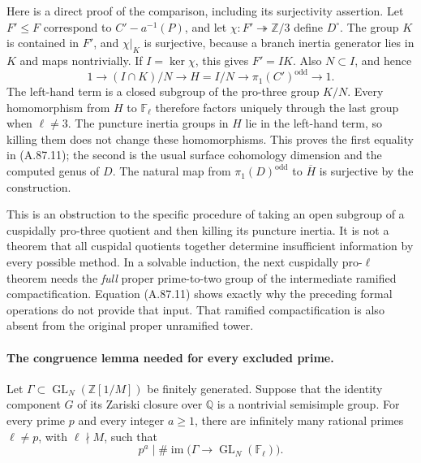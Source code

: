 \documentclass[11pt]{article}
\begin{document}
Here is a direct proof of the comparison, including its
surjectivity assertion. Let \(F'\leq F\) correspond to
\(C'-a^{-1}(P)\), and let
\(\chi:F'\twoheadrightarrow\mathbb Z/3\) define
\(D^\circ\). The group \(K\) is contained in \(F'\),
and \(\chi|_K\) is surjective, because a branch inertia
generator lies in \(K\) and maps nontrivially. If
\(I=\ker\chi\), this gives \(F'=IK\). Also \(N\subset I\),
and hence
\[
 1\longrightarrow (I\cap K)/N\longrightarrow
 H=I/N\longrightarrow \pi_1(C')^{\mathrm{odd}}
 \longrightarrow1.                                  \tag{A.87.12}
\]
The left-hand term is a closed subgroup of the pro-three
group \(K/N\). Every homomorphism from \(H\) to
\(\mathbb F_\ell\) therefore factors uniquely through
the last group when \(\ell\ne3\). The puncture inertia
groups in \(H\) lie in the left-hand term, so killing them
does not change these homomorphisms. This proves the first
equality in (A.87.11); the second is the usual surface
cohomology dimension and the computed genus of \(D\).
The natural map from \(\pi_1(D)^{\mathrm{odd}}\) to
\(\overline H\) is surjective by the construction.

This is an obstruction to the specific procedure of taking
an open subgroup of a cuspidally pro-three quotient and then
killing its puncture inertia. It is not a theorem that all
cuspidal quotients together determine insufficient information
by every possible method. In a solvable induction, the next
cuspidally pro-\(\ell\) theorem needs the \emph{full} proper
prime-to-two group of the intermediate ramified compactification.
Equation (A.87.11) shows exactly why the preceding formal
operations do not provide that input. That ramified
compactification is also absent from the original proper
unramified tower.


\paragraph{The congruence lemma needed for every excluded prime.}
Let \(\Gamma\subset\operatorname{GL}_N(\mathbb Z[1/M])\) be
finitely generated. Suppose that the identity component \(G\) of its
Zariski closure over \(\mathbb Q\) is a nontrivial semisimple group.
For every prime \(p\) and every integer \(a\geq1\), there are
infinitely many rational primes \(\ell\ne p\), with \(\ell\nmid M\),
such that
\[
       p^a\mid
       \#\operatorname{im}\bigl(\Gamma\longrightarrow
                    \operatorname{GL}_N(\mathbb F_\ell)\bigr).
                                                        \tag{A.87.13}
\]
\end{document}
